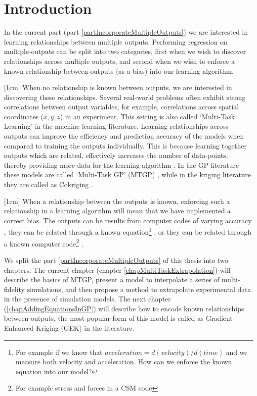 
\section{Introduction}

In the current part (part \ref{partIncorporateMultipleOutputs}) we are interested in learning relationships between multiple outputs. Performing regression on multiple-outputs can be split into two categories, first when we wish to discover relationships across multiple outputs, and second when we wish to enforce a known relationship between outputs (as a bias) into our learning algorithm.

[1cm]
When no relationship is known between outputs, we are interested in discovering these relationships. Several real-world problems often exhibit strong correlations between output variables, for example, correlations across spatial coordinates ($x, y, z$) in an experiment. This setting is also called `Multi-Task Learning' in the machine learning literature. Learning relationships across outputs can improve the efficiency and prediction accuracy of the models when compared to training the outputs individually. This is because learning together outputs which are related, effectively increases the number of data-points, thereby providing more data for the learning algorithm  \cite{caruana1998multitask}. In the GP literature these models are called `Multi-Task GP' (MTGP) \cite{alvarez2011kernels, bonilla_multi-task_2008, Boyle05dependentgaussian}, while in the kriging literature they are called as Cokriging \cite{helterbrand1994universal, chiles1999geostatistics, ver1998constructing}.

[1cm]
\sloppy
When a relationship between the outputs is known, enforcing such a relationship in a learning algorithm will mean that we have implemented a correct bias. The outputs can be results from computer codes of varying accuracy \cite{kennedy2000predicting, forrester2007multi, le2013multi}, they can be related through a known equation\footnote{For example if we know that $acceleration = d(velocity)/d(time)$ and we measure both velocity and acceleration. How can we enforce the known equation into our model?} \cite{ginsbourger2013invariances, sarkka2011linear}, or they can be related through a known computer code\footnote{For example stress and forces in a CSM code} \cite{Constantinescu2013}. 

We split the part \ref{partIncorporateMultipleOutputs} of this thesis into two chapters. The current chapter (chapter \ref{chapMultiTaskExtrapolation}) will describe the basics of MTGP, present a model to interpolate a series of multi-fidelity simulations, and then propose a method to extrapolate experimental data in the presence of simulation models. The next chapter (\ref{chapAddingEquationsInGP}) will describe how to encode known relationships between outputs, the most popular form of this model is called as Gradient Enhanced Kriging (GEK) in the literature. 

